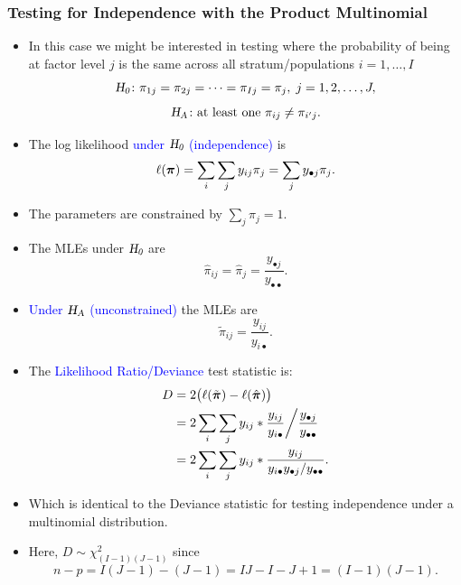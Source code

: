 \documentclass[oneside]{book}\usepackage[]{graphicx}\usepackage[svgnames]{xcolor}
\let\log\relax%
\newcommand{\HN}{\textsl{H}_{\textsl{0}}}%
\newcommand{\HA}{\textsl{H}_{\textsl{A}}}%
\providecommand{\Vector}[1]{\bm{#1}}%
\begin{document}
\subsubsection*{Testing for Independence with the Product Multinomial}
\begin{itemize}
    \item In this case we might be interested in testing where the probability of being at
          factor level $j$ is the same across all stratum/populations $ i=1,\ldots,I $
          \[ \HN\colon \pi_{1j}=\pi_{2j}=\cdots=\pi_{Ij}=\pi_j,\;j=1,2,\ldots,J, \]
          \[ \HA\colon \text{at least one }\pi_{ij}\ne \pi_{i^\prime j}. \]
    \item The log likelihood \textcolor{Blue}{under $ \HN $ (independence)} is
          \[ \ell(\Vector{\pi})=\sum_i\sum_j y_{ij}\log{\pi_{j}}=\sum_j y_{\bullet j}\log{\pi_{j}}. \]
    \item The parameters are constrained by $ \sum_{j}\pi_j=1 $.
    \item The MLEs under $ \HN $ are
          \[ \hat{\pi}_{ij}=\hat{\pi}_j=\frac{y_{\bullet j}}{y_{\bullet\bullet}}. \]
    \item \textcolor{Blue}{Under $ \HA $ (unconstrained)} the MLEs are
          \[ \tilde{\pi}_{ij}=\frac{y_{ij}}{y_{i\bullet}}. \]
    \item The \textcolor{Blue}{Likelihood Ratio/Deviance} test statistic is:
          \begin{align*}
              D
               & =2\bigl(\ell(\tilde{\Vector{\pi}})-\ell(\hat{\Vector{\pi}})\bigr)                                     \\
               & =2\sum_i\sum_j y_{ij}\log*{\frac{y_{ij}}{y_{i\bullet}}\bigg/\frac{y_{\bullet j}}{y_{\bullet\bullet}}} \\
               & =2\sum_i\sum_j y_{ij}\log*{\frac{y_{ij}}{y_{i\bullet}y_{\bullet j}/y_{\bullet\bullet}}}.
          \end{align*}
    \item Which is identical to the Deviance statistic for testing independence under a
          multinomial distribution.
    \item Here, $ D \sim \chi^2_{(I-1)(J-1)} $ since
          \[ n-p=I(J-1)-(J-1)=IJ-I-J+1=(I-1)(J-1). \]
\end{itemize}
\end{document}
